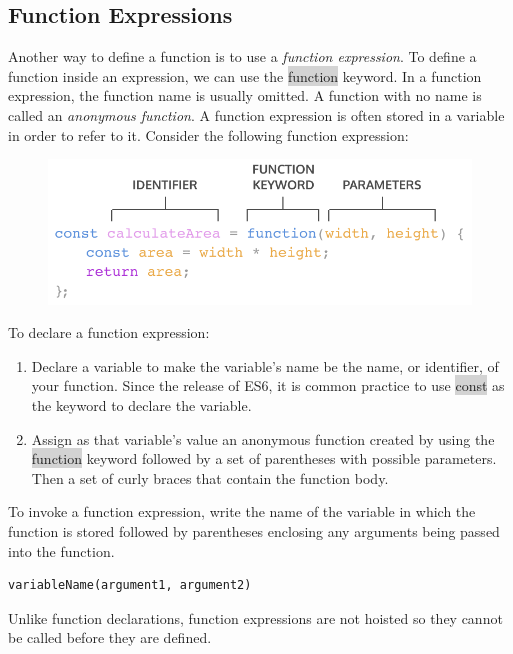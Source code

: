 \documentclass[11pt]{article}
\begin{document}
\subsection{Function Expressions}
Another way to define a function is to use a \textit{function expression}. To define a function inside an expression, we can use the \colorbox{lightgray}{function} keyword. In a function expression, the function name is usually omitted. A function with no name is called an \textit{anonymous function}. A function expression is often stored in a variable in order to refer to it. Consider the following function expression:
\begin{figure}[H]
\includegraphics[scale = 0.73]{4_8}
\centering
\end{figure}
To declare a function expression:
\begin{enumerate}[leftmargin = *]
\item Declare a variable to make the variable’s name be the name, or identifier, of your function. Since the release of ES6, it is common practice to use \colorbox{lightgray}{const} as the keyword to declare the variable.
\item Assign as that variable’s value an anonymous function created by using the \colorbox{lightgray}{function} keyword followed by a set of parentheses with possible parameters. Then a set of curly braces that contain the function body.
\end{enumerate}
To invoke a function expression, write the name of the variable in which the function is stored followed by parentheses enclosing any arguments being passed into the function.
\begin{lstlisting}
variableName(argument1, argument2)
\end{lstlisting}
Unlike function declarations, function expressions are not hoisted so they cannot be called before they are defined.
\end{document}
